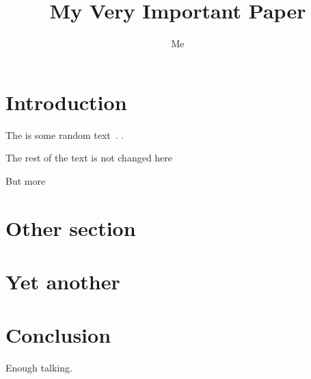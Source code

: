 \documentclass[journal]{IEEEtran}
\def\thetitle{My Very Important Paper}
\def\theauthor{Me}
\begin{document}
\title{\thetitle}
\author{\theauthor}

\maketitle


\begin{abstract}
  \lipsum[1]
\end{abstract}

\section{Introduction}
The is some random text~\cite{samplebib}.
.

The rest of the text is not changed here \lipsum[1]

But more 

\section{Other section}
\lipsum[3]
\lipsum[4]

\section{Yet another}
\lipsum[5]

\section{Conclusion}
Enough talking.




\end{document}

